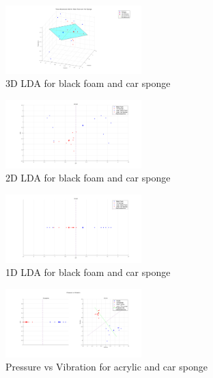\documentclass[10pt,twocolumn,letterpaper]{article}
\begin{document}
\begin{figure}[h]
\begin{center}
   \includegraphics[width=0.47\textwidth]{sec3_part1b_1}
\end{center}
   \caption{3D LDA for black foam and car sponge}
\label{fig:20}
\end{figure}

\begin{figure}[h]
\begin{center}
   \includegraphics[width=0.47\textwidth]{sec3_part1b_2}
\end{center}
   \caption{2D LDA for black foam and car sponge}
\label{fig:21}
\end{figure}

\begin{figure}[h]
\begin{center}
   \includegraphics[width=0.47\textwidth]{sec3_part1b_3}
\end{center}
   \caption{1D LDA for black foam and car sponge}
\label{fig:22}
\end{figure}

\begin{figure}[h]
\begin{center}
   \includegraphics[width=0.47\textwidth]{sec3_part1d_1}
\end{center}
   \caption{Pressure vs Vibration for acrylic and car sponge}
\label{fig:23}
\end{figure}
\end{document}
